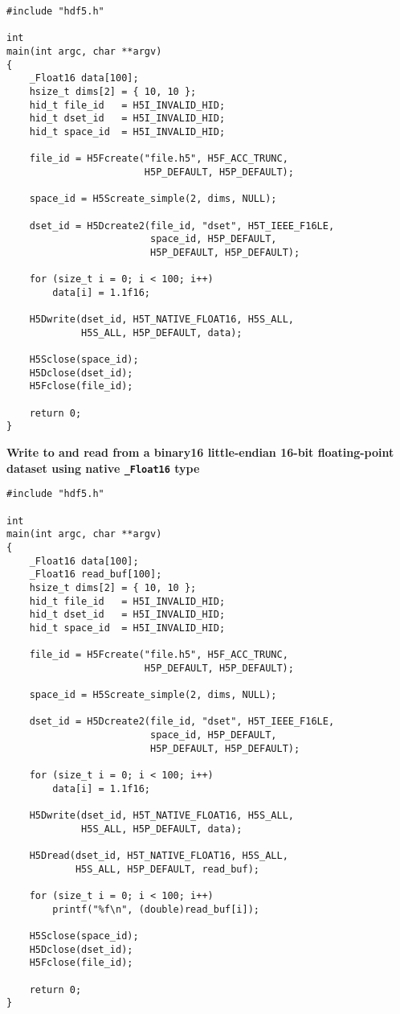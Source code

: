\documentclass[../HDF5_RFC.tex]{subfiles}
\begin{document}
\begin{verbatim}
#include "hdf5.h"

int
main(int argc, char **argv)
{
    _Float16 data[100];
    hsize_t dims[2] = { 10, 10 };
    hid_t file_id   = H5I_INVALID_HID;
    hid_t dset_id   = H5I_INVALID_HID;
    hid_t space_id  = H5I_INVALID_HID;

    file_id = H5Fcreate("file.h5", H5F_ACC_TRUNC,
                        H5P_DEFAULT, H5P_DEFAULT);

    space_id = H5Screate_simple(2, dims, NULL);

    dset_id = H5Dcreate2(file_id, "dset", H5T_IEEE_F16LE,
                         space_id, H5P_DEFAULT,
                         H5P_DEFAULT, H5P_DEFAULT);

    for (size_t i = 0; i < 100; i++)
        data[i] = 1.1f16;

    H5Dwrite(dset_id, H5T_NATIVE_FLOAT16, H5S_ALL,
             H5S_ALL, H5P_DEFAULT, data);

    H5Sclose(space_id);
    H5Dclose(dset_id);
    H5Fclose(file_id);

    return 0;
}
\end{verbatim}

\newpage

\textbf{Write to and read from a binary16 little-endian 16-bit floating-point dataset using native \texttt{\_Float16} type}

\begin{verbatim}
#include "hdf5.h"

int
main(int argc, char **argv)
{
    _Float16 data[100];
    _Float16 read_buf[100];
    hsize_t dims[2] = { 10, 10 };
    hid_t file_id   = H5I_INVALID_HID;
    hid_t dset_id   = H5I_INVALID_HID;
    hid_t space_id  = H5I_INVALID_HID;

    file_id = H5Fcreate("file.h5", H5F_ACC_TRUNC,
                        H5P_DEFAULT, H5P_DEFAULT);

    space_id = H5Screate_simple(2, dims, NULL);

    dset_id = H5Dcreate2(file_id, "dset", H5T_IEEE_F16LE,
                         space_id, H5P_DEFAULT,
                         H5P_DEFAULT, H5P_DEFAULT);

    for (size_t i = 0; i < 100; i++)
        data[i] = 1.1f16;

    H5Dwrite(dset_id, H5T_NATIVE_FLOAT16, H5S_ALL,
             H5S_ALL, H5P_DEFAULT, data);

    H5Dread(dset_id, H5T_NATIVE_FLOAT16, H5S_ALL,
            H5S_ALL, H5P_DEFAULT, read_buf);

    for (size_t i = 0; i < 100; i++)
        printf("%f\n", (double)read_buf[i]);

    H5Sclose(space_id);
    H5Dclose(dset_id);
    H5Fclose(file_id);

    return 0;
}
\end{verbatim}
\end{document}
